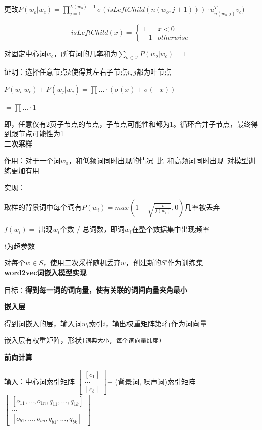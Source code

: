 \documentclass[UTF8]{ctexart}
\begin{document}
  \quad 更改$P(w_o | w_c) = \prod_{j=1}^{L(w_o) - 1} \sigma(isLeftChild(n(w_o, j+1))) \cdot u_{n(w_o, j)}^Tv_c)$

  \quad \quad \begin{equation*}
    isLeftChild(x) = \begin{cases}
    1 &x < 0\\
    -1 & otherwise
    \end{cases}
  \end{equation*}

  \quad \quad 对固定中心词$w_c$，所有词的几率和为$\sum_{o \in \mathcal{V}} P(w_o | w_c) = 1$

  \quad \quad \quad 证明：选择任意节点$k$使得其左右子节点$i, j$都为叶节点

  \quad \quad \quad \quad $P(w_i | w_c) + P(w_j | w_c) = \prod ... \cdot (\sigma(x) + \sigma(-x))$

  \quad \quad \quad \quad $ = \prod ... \cdot 1$

  \quad \quad \quad \quad 即，任意仅有2页子节点的节点，子节点可能性和都为1。循环合并子节点，最终得到跟节点可能性为1\\
\textbf{二次采样}

  作用：对于一个词$w_0$，和低频词同时出现的情况\ 比\ 和高频词同时出现\ 对模型训练更加有用

  实现：
  
  \quad 取样的背景词中每个词有$P(w_i) = max(1-\sqrt{\frac{t}{f(w_i)}}, 0)$几率被丢弃

  \quad \quad $f(w_i) = $ 出现$w_i$个数 / 总词数，即词$w_i$在整个数据集中出现频率

  \quad \quad $t$为超参数

  \quad 对每个$w \in S$，使用二次采样随机丢弃$w$，创建新的$S'$作为训练集\\
\textbf{word2vec词嵌入模型实现}

  目标：\textbf{得到每一词的词向量，使有关联的词间向量夹角最小}

  \textbf{嵌入层}

  \quad 得到词嵌入的层，输入词$w_i$索引$i$，输出权重矩阵第$i$行作为词向量

  \quad 嵌入层有权重矩阵，形状\texttt{(词典大小, 每个词向量纬度)}

  \textbf{前向计算}

  \quad 输入：中心词索引矩阵
    $\begin{bmatrix}
      [c_1] \\
      ... \\
      [c_b]
      \end{bmatrix}
    $+ (背景词, 噪声词)索引矩阵
    $\begin{bmatrix}
      [o_{11}, ..., o_{1n}, q_{11}, ..., q_{1k}] \\
      ... \\
      [o_{b1}, ..., o_{bn}, q_{b1}, ..., q_{bk}]
      \end{bmatrix}
    $
\end{document}

